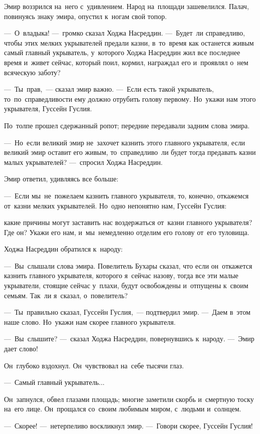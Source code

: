 \documentclass[12pt,a4paper]{book}
\begin{document}
Эмир воззрился на~него с~удивлением. Народ на~площади зашевелился. Палач, повинуясь знаку эмира, опустил к~ногам свой топор.

—~О~владыка! —~громко сказал Ходжа Насреддин. —~Будет~ли справедливо, чтобы этих мелких укрывателей предали казни, в~то~время как останется живым самый главный укрыватель, у~которого Ходжа Насреддин жил все последнее время и~живет сейчас, который поил, кормил, награждал его и~проявлял о~нем всяческую заботу?

—~Ты~прав,~— сказал эмир важно. —~Если есть такой укрыватель, то~по~справедливости ему должно отрубить голову первому. Но~укажи нам этого укрывателя, Гуссейн Гуслия.

По~толпе прошел сдержанный ропот; передние передавали задним слова эмира.

—~Но~если великий эмир не~захочет казнить этого главного укрывателя, если великий эмир оставит его живым, то~справедливо~ли будет тогда предавать казни малых укрывателей? —~спросил Ходжа Насреддин.

Эмир ответил, удивляясь все больше:

—~Если мы~не~пожелаем казнить главного укрывателя, то, конечно, откажемся от~казни мелких укрывателей. Но~одно непонятно нам, Гуссейн Гуслия:

какие причины могут заставить нас воздержаться от~казни главного укрывателя? Где он? Укажи его нам, и~мы~немедленно отделим его голову от~его туловища.

Ходжа Насреддин обратился к~народу:

—~Вы~слышали слова эмира. Повелитель Бухары сказал, что если он~откажется казнить главного укрывателя, которого я~сейчас назову, тогда все эти малые укрыватели, стоящие сейчас у~плахи, будут освобождены и~отпущены к~своим семьям. Так~ли я~сказал, о~повелитель?

—~Ты~правильно сказал, Гуссейн Гуслия,~— подтвердил эмир. —~Даем в~этом наше слово. Но~укажи нам скорее главного укрывателя.

—~Вы~слышите? —~сказал Ходжа Насреддин, повернувшись к~народу. —~Эмир дает слово!

Он~глубоко вздохнул. Он~чувствовал на~себе тысячи глаз.

—~Самый главный укрыватель...

Он~запнулся, обвел глазами площадь; многие заметили скорбь и~смертную тоску на~его лице. Он~прощался со~своим любимым миром, с~людьми и~солнцем.

—~Скорее! —~нетерпеливо воскликнул эмир. —~Говори скорее, Гуссейн Гуслия!
\end{document}
